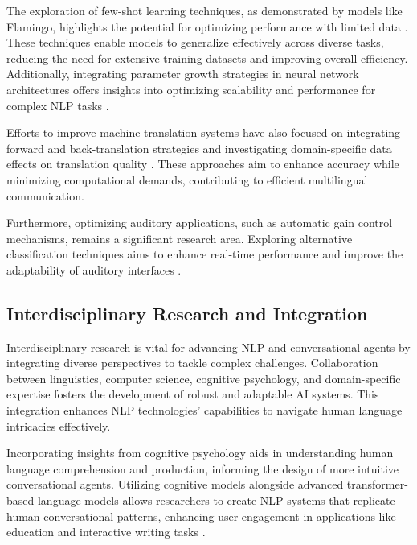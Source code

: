 The exploration of few-shot learning techniques, as demonstrated by models like Flamingo, highlights the potential for optimizing performance with limited data \cite{alayrac2022flamingo}. These techniques enable models to generalize effectively across diverse tasks, reducing the need for extensive training datasets and improving overall efficiency. Additionally, integrating parameter growth strategies in neural network architectures offers insights into optimizing scalability and performance for complex NLP tasks \cite{chowdhery2023palm}.

Efforts to improve machine translation systems have also focused on integrating forward and back-translation strategies and investigating domain-specific data effects on translation quality \cite{bogoychev2020domaintranslationesenoisesynthetic}. These approaches aim to enhance accuracy while minimizing computational demands, contributing to efficient multilingual communication.

Furthermore, optimizing auditory applications, such as automatic gain control mechanisms, remains a significant research area. Exploring alternative classification techniques aims to enhance real-time performance and improve the adaptability of auditory interfaces \cite{haghighi2017eegassistedmodulationsoundsources}.

\subsection{Interdisciplinary Research and Integration} \label{subsec:Interdisciplinary Research and Integration}

Interdisciplinary research is vital for advancing NLP and conversational agents by integrating diverse perspectives to tackle complex challenges. Collaboration between linguistics, computer science, cognitive psychology, and domain-specific expertise fosters the development of robust and adaptable AI systems. This integration enhances NLP technologies' capabilities to navigate human language intricacies effectively.

Incorporating insights from cognitive psychology aids in understanding human language comprehension and production, informing the design of more intuitive conversational agents. Utilizing cognitive models alongside advanced transformer-based language models allows researchers to create NLP systems that replicate human conversational patterns, enhancing user engagement in applications like education and interactive writing tasks \cite{kasneci2023chatgpt,wei2022chain,ginzburg2021selfsuperviseddocumentsimilarityranking}.

